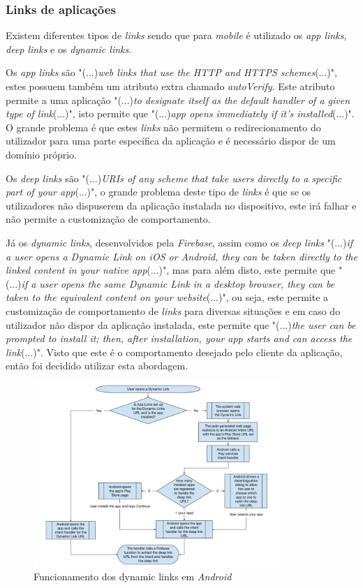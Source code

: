 \subsubsection{Links de aplicações}

Existem diferentes tipos de \textit{links} sendo que para \textit{mobile} é utilizado os \textit{app links}, \textit{deep links} e os \textit{dynamic links}.

Os \emph{app links} são "(...)\emph{web links that use the HTTP and HTTPS schemes}(...)"\citep{linking}, estes possuem também um atributo extra chamado \textit{autoVerify}. Este atributo permite a uma aplicação "(...)\emph{to designate itself as the default handler of a given type of link}(...)"\citep{linking}, isto permite que "(...)\emph{app opens immediately if it's installed}(...)"\citep{linking}. O grande problema é que estes \textit{links} não permitem o redirecionamento do utilizador para uma parte específica da aplicação e é necessário dispor de um domínio próprio.


Os \textit{deep links} são "(...)\emph{URIs of any scheme that take users directly to a specific part of your app}(...)"\citep{linking}, o grande problema deste tipo de \textit{links} é que se os utilizadores não dispuserem da aplicação instalada no dispositivo, este irá falhar e não permite a customização de comportamento.

Já os \textit{dynamic links}, desenvolvidos pela \textit{Firebase}, assim como os \textit{deep links} "(...)\emph{if a user opens a Dynamic Link on iOS or Android, they can be taken directly to the linked content in your native app}(...)"\citep{dynamic_linking}, mas para além disto, este permite que "(...)\emph{if a user opens the same Dynamic Link in a desktop browser, they can be taken to the equivalent content on your website}(...)"\citep{dynamic_linking}, ou seja, este permite a customização de comportamento de \textit{links} para diversas situações e em caso do utilizador não dispor da aplicação instalada, este permite que "(...)\emph{the user can be prompted to install it; then, after installation, your app starts and can access the link}(...)"\citep{dynamic_linking}. Visto que este é o comportamento desejado pelo cliente da aplicação, então foi decidido utilizar esta abordagem.

\begin{figure}[htb]
  \centering
  \includegraphics[width=0.83\textwidth]{images/diagramas/fdl-android-integration.png}
  \caption{Funcionamento dos dynamic links em \textit{Android} \citep{linking_firebase}}
  \label{fig:23}
\end{figure}
